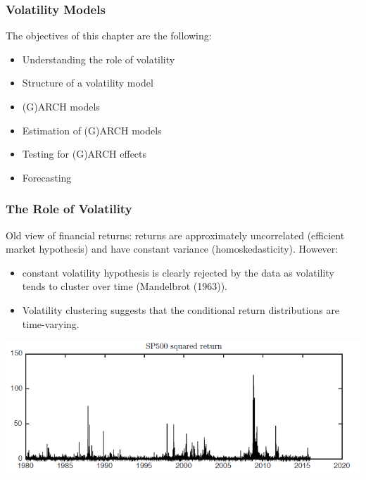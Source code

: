 \documentclass[xcolor=dvipsnames, english, 8pt]{beamer}
\begin{document}
\begin{frame}
    \frametitle{Volatility Models}
    The objectives of this chapter are the following:\vspace{0.25cm}\\
    \begin{itemize}
        \item Understanding the role of volatility
        \item Structure of a volatility model
        \item (G)ARCH models
        \item Estimation of (G)ARCH models
        \item Testing for (G)ARCH effects
        \item Forecasting

    \end{itemize}
\end{frame}

\begin{frame}
    \frametitle{The Role of Volatility}
    Old view of financial returns: returns are approximately uncorrelated (efficient
market hypothesis) and have constant variance ({\color{ubRed}homoskedasticity}). However:\vspace{0.25cm}\\
\begin{itemize}
    \item constant volatility hypothesis is clearly rejected by the data as volatility tends to {\color{ubRed} cluster} over time (Mandelbrot (1963)).
\item Volatility clustering suggests that the {\color{ubRed} conditional} return distributions are time-varying.\vspace{0.5cm}\\
\end{itemize}
\begin{center}
    \includegraphics[scale=0.5]{VOLA1}
\end{center}
\end{frame}
\end{document}

